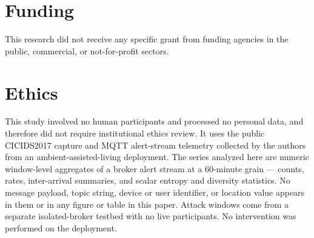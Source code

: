 \documentclass[a4paper,fleqn]{cas-dc}
\begin{document}
\section*{Funding}
This research did not receive any specific grant from funding agencies in the public, commercial, or
not-for-profit sectors.

\section*{Ethics}
This study involved no human participants and processed no personal data, and therefore did not
require institutional ethics review. It uses the public CICIDS2017 capture and MQTT alert-stream
telemetry collected by the authors from an ambient-assisted-living deployment. The series analyzed here are numeric
window-level aggregates of a broker alert stream at a $60$-minute grain --- counts, rates,
inter-arrival summaries, and scalar entropy and diversity statistics. No message payload, topic
string, device or user identifier, or location value appears in them or in any figure or table in
this paper. Attack windows come from a separate isolated-broker testbed with no live participants.
No intervention was performed on the deployment.
\end{document}
